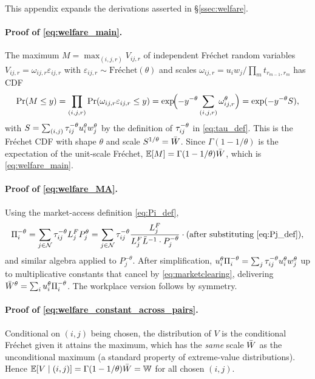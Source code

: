 This appendix expands the derivations asserted in
\S\ref{ssec:welfare}.

\paragraph{Proof of \eqref{eq:welfare_main}.}
The maximum $M=\max_{(i,j,r)}V_{ij,r}$ of independent Fr\'echet random
variables $V_{ij,r}=\omega_{ij,r}\varepsilon_{ij,r}$ with
$\varepsilon_{ij,r}\sim\text{Fr\'echet}(\theta)$ and scales
$\omega_{ij,r}=u_iw_j/\prod_m t_{r_{m-1},r_m}$ has CDF
\[
  \Pr(M\le y)=\prod_{(i,j,r)}\Pr(\omega_{ij,r}\varepsilon_{ij,r}\le y)
  =\exp\!\Bigl(-y^{-\theta}\sum_{(i,j,r)}\omega_{ij,r}^{\theta}\Bigr)
  =\exp(-y^{-\theta}S),
\]
with $S=\sum_{(i,j)}\tau_{ij}^{-\theta}u_i^{\theta}w_j^{\theta}$ by the
definition of $\tau_{ij}^{-\theta}$ in \eqref{eq:tau_def}.  This is the
Fr\'echet CDF with shape $\theta$ and scale $S^{1/\theta}=\bar W$.
Since $\Gamma(1-1/\theta)$ is the expectation of the unit-scale
Fr\'echet, $\mathbb E[M]=\Gamma(1-1/\theta)\bar W$, which is
\eqref{eq:welfare_main}.

\paragraph{Proof of \eqref{eq:welfare_MA}.}
Using the market-access definition \eqref{eq:Pi_def},
\[
  \Pi_i^{-\theta}
  =\sum_{j\in\mathcal N}\tau_{ij}^{-\theta}L_j^FP_j^{\theta}
  =\sum_{j\in\mathcal N}\tau_{ij}^{-\theta}\frac{L_j^F}{L_j^F\bar L^{-1}\cdot P_j^{-\theta}}
  \cdot (\text{after substituting \eqref{eq:Pj_def}}),
\]
and similar algebra applied to $P_j^{-\theta}$.  After simplification,
$u_i^{\theta}\Pi_i^{-\theta}=\sum_j\tau_{ij}^{-\theta}u_i^{\theta}w_j^{\theta}$
up to multiplicative constants that cancel by
\eqref{eq:marketclearing}, delivering
$\bar W^{\theta}=\sum_iu_i^{\theta}\Pi_i^{-\theta}$.  The workplace
version follows by symmetry.

\paragraph{Proof of \eqref{eq:welfare_constant_across_pairs}.}
Conditional on $(i,j)$ being chosen, the distribution of $V$ is the
conditional Fr\'echet given it attains the maximum, which has the
\emph{same} scale $\bar W$ as the unconditional maximum (a standard
property of extreme-value distributions).  Hence
$\mathbb E[V\mid(i,j)]=\Gamma(1-1/\theta)\bar W=\mathbb W$ for all
chosen $(i,j)$.


